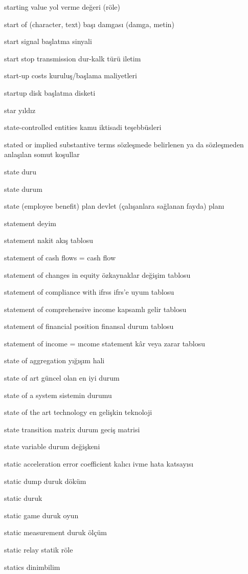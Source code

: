 \documentclass[12pt,fleqn]{article}\usepackage{../../common}
\begin{document}
starting value yol verme değeri (röle)

start of (character, text) başı damgası (damga, metin)

start signal başlatma sinyali

start stop transmission dur-kalk türü iletim

start-up costs kuruluş/başlama maliyetleri

startup disk başlatma disketi

star yıldız

state-controlled entities kamu iktisadi teşebbüsleri

stated or implied substantive terms sözleşmede belirlenen ya da sözleşmeden anlaşılan somut koşullar

state duru

state durum

state (employee benefit) plan devlet (çalışanlara sağlanan fayda) planı

statement deyim

statement nakit akış tablosu

statement of cash flows = cash flow

statement of changes in equity özkaynaklar değişim tablosu

statement of compliance with ifrss ifrs'e uyum tablosu

statement of comprehensive income kapsamlı gelir tablosu

statement of financial position finansal durum tablosu

statement of income = ıncome statement kâr veya zarar tablosu

state of aggregation yığışım hali

state of art güncel olan en iyi durum

state of a system sistemin durumu

state of the art technology en gelişkin teknoloji

state transition matrix durum geciş matrisi

state variable durum değişkeni

static acceleration error coefficient kalıcı ivme hata katsayısı

static dump duruk döküm

static duruk

static game duruk oyun

static measurement duruk ölçüm

static relay statik röle

statics dinimbilim
\end{document}
